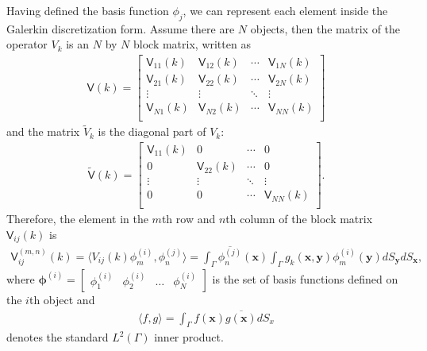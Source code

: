 Having defined the basis function $\phi_j$, we can represent each element inside the Galerkin discretization form. Assume there are $N$ objects,
then the matrix of the operator $V_{k}$ is an $N$ by $N$ block matrix, written as 
\begin{align}\label{matrix V}
    \mathsf{V}(k) = \begin{bmatrix}
        \mathsf{V}_{11}(k) & \mathsf{V}_{12}(k) & \cdots & \mathsf{V}_{1N}(k) \\
        \mathsf{V}_{21}(k) & \mathsf{V}_{22}(k) & \cdots & \mathsf{V}_{2N}(k) \\
        \vdots & \vdots & \ddots & \vdots \\
        \mathsf{V}_{N1}(k) & \mathsf{V}_{N2}(k) & \cdots & \mathsf{V}_{NN}(k) \\
\end{bmatrix}
\end{align}
and the matrix $\tilde{V}_{k}$ is the diagonal part of $V_{k}$:
\begin{align}\label{matrix tilde V}
    \tilde{\mathsf{V}}(k) = \begin{bmatrix}
        \mathsf{V}_{11}(k) & 0      & \cdots & 0 \\
    0      & \mathsf{V}_{22}(k) & \cdots & 0\\
    \vdots & \vdots & \ddots & \vdots \\
    0      & 0      & \cdots & \mathsf{V}_{NN}(k) \\
\end{bmatrix}.
\end{align}
Therefore, the element in the $m$th row and $n$th column of the block matrix $\mathsf{V}_{ij}(k)$ is 
\begin{align}\label{Elements in matrix V}
    \mathsf{V}_{ij}^{(m,n)} (k) = \langle V_{ij}(k)\phi_{m}^{(i)}, \phi_{n}^{(j)}\rangle = 
    \int_{\Gamma}\overline{\phi_{n}^{(j)}}(\boldsymbol{x})\int_{\Gamma}g_{k}(\boldsymbol{x}, \boldsymbol{y})\phi_{m}^{(i)}(\boldsymbol{y})dS_{\boldsymbol{y}}dS_{\boldsymbol{x}},
\end{align}
where $\boldsymbol{\phi}^{(i)} = \begin{bmatrix}
    \phi_{1}^{(i)} & \phi_{2}^{(i)} & \dots & \phi_{N}^{(i)}
\end{bmatrix}$ is the set of basis functions defined on the $i$th object and 
\begin{align*}
    \langle f, g \rangle = \int_{\Gamma}{f(\boldsymbol{x})}\overline{g(\boldsymbol{x})}dS_{x}
\end{align*}
denotes the standard $L^{2}(\Gamma)$ inner product.


